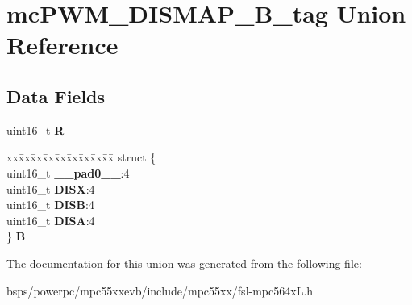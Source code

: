 \hypertarget{unionmcPWM__DISMAP__16B__tag}{}\section{mc\+P\+W\+M\+\_\+\+D\+I\+S\+M\+A\+P\+\_\+B\+\_\+tag Union Reference}
\label{unionmcPWM__DISMAP__16B__tag}
\subsection*{Data Fields}
\begin{DoxyCompactItemize}
\item 
\mbox{\label{unionmcPWM__DISMAP__16B__tag_a39c2d64780a7306813989c71dd6924bd}} 
uint16\+\_\+t {\bfseries R}
\item 
\mbox{\label{unionmcPWM__DISMAP__16B__tag_a331a300fae21353c47e4dedbd146f608}} 
\begin{tabbing}
xx\=xx\=xx\=xx\=xx\=xx\=xx\=xx\=xx\=\kill
struct \{\\
\>uint16\_t {\bfseries \_\_pad0\_\_}:4\\
\>uint16\_t {\bfseries DISX}:4\\
\>uint16\_t {\bfseries DISB}:4\\
\>uint16\_t {\bfseries DISA}:4\\
\} {\bfseries B}\\

\end{tabbing}\end{DoxyCompactItemize}


The documentation for this union was generated from the following file\+:\begin{DoxyCompactItemize}
\item 
bsps/powerpc/mpc55xxevb/include/mpc55xx/fsl-\/mpc564x\+L.\+h\end{DoxyCompactItemize}
